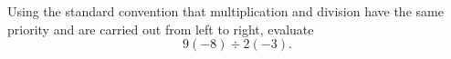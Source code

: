 Using the standard convention that multiplication and division have the same priority and are carried out from left to right, evaluate
\[
9(-8)\div2(-3).
\]
